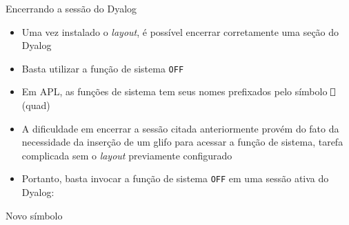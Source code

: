 \begin{frame}[fragile]{Encerrando a sessão do Dyalog}

    \begin{itemize}
        \item Uma vez instalado o \textit{layout}, é possível encerrar corretamente uma seção do Dyalog
        \pause

        \item Basta utilizar a função de sistema \texttt{OFF}
        \pause

        \item Em APL, as funções de sistema tem seus nomes prefixados pelo símbolo \texttt{⎕} (quad)
        \pause

        \item A dificuldade em encerrar a sessão citada anteriormente provém do fato da necessidade
            da inserção de um glifo para acessar a função de sistema, tarefa complicada sem o
            \textit{layout} previamente configurado

        \pause

        \item Portanto, basta invocar a função de sistema \texttt{OFF} em uma sessão ativa do Dyalog:


    \end{itemize}

\end{frame}

\begin{frame}[fragile]{Novo símbolo}


\end{frame}

%


